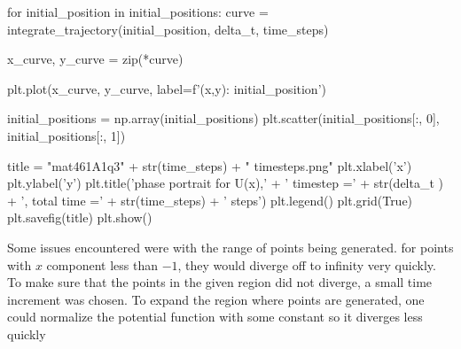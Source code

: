 \documentclass[12pt, a4paper]{article}
\theoremstyle{definition}
\begin{document}
\begin{python}
	
	for initial_position in initial_positions:
	curve = integrate_trajectory(initial_position, delta_t, time_steps)
	
	x_curve, y_curve = zip(*curve)
	
	plt.plot(x_curve, y_curve, label=f'(x,y): {initial_position}')
	
	initial_positions = np.array(initial_positions)
	plt.scatter(initial_positions[:, 0], initial_positions[:, 1])
	
	title = "mat461A1q3" + str(time_steps) + " timesteps.png"
	plt.xlabel('x')
	plt.ylabel('y')
	plt.title('phase portrait for U(x),' + ' timestep =' + str(delta_t ) + ', total time =' + str(time_steps) + ' steps')
	plt.legend()
	plt.grid(True)
	plt.savefig(title)
	plt.show()
\end{python}
Some issues encountered were with the range of points being generated. for points with $x$ component less than $-1$, they would diverge off to infinity very quickly. To make sure that the points in the given region did not diverge, a small time increment was chosen. To expand the region where points are generated, one could normalize the potential function with some constant so it diverges less quickly
\end{document}
